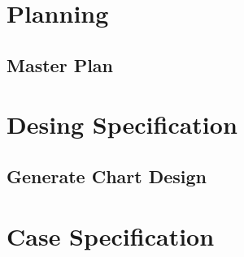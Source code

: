 \documentclass[a4paper, 12pt]{report}
\begin{document}
\tableofcontents

\part{Planning}

\chapter{Master Plan}


\part{Desing Specification}
\label{part:DesignSpecification}
\chapter{Generate Chart Design}


\part{Case Specification}
\label{part:CaseSpecification}


\end{document}
